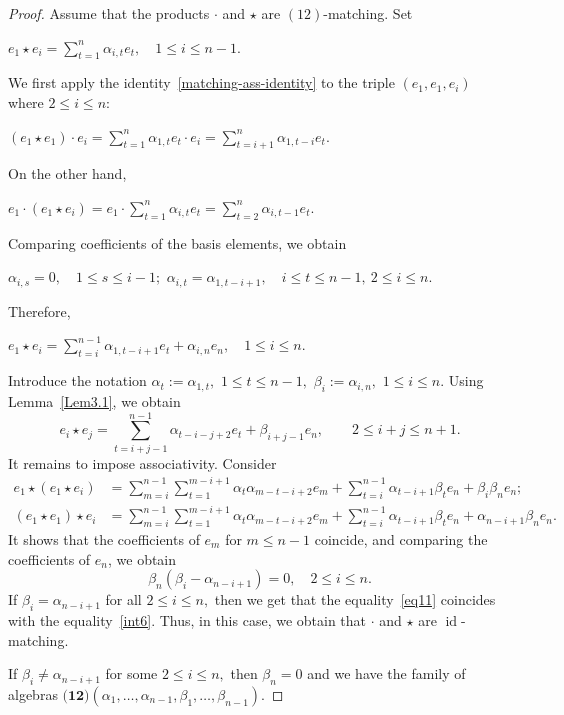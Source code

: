 \documentclass{jonasart}
\DeclareMathOperator{\id}{id}
\begin{document}
	\begin{proof}
		Assume that the products $\cdot$ and $\star$ are $ (12)$-matching. Set
		\begin{center}
			$e_1\star e_i =\sum_{t=1}^{n}\alpha_{i,t}e_t, \quad 1 \leq i \leq n-1.$
		\end{center}
		We first apply the identity~\eqref{matching-ass-identity} to the triple
		$(e_1, e_1, e_i )$ where $2\leq i \leq n:$
		\begin{center}
			$(e_1 \star e_1 )\cdot e_i =\sum_{t=1}^{n}\alpha_{1,t}e_t \cdot e_i =\sum_{t=i+1}^{n}\alpha_{1,t-i}e_t.$
		\end{center}
		On the other hand,
		\begin{center}
			$e_1\cdot (e_1\star e_i )= e_1\cdot \sum_{t=1}^{n}\alpha_{i,t}e_t = \sum_{t=2}^{n}\alpha_{i,t-1}e_t.$
		\end{center}
		Comparing coefficients of the basis elements, we obtain
		\begin{center}
			$\alpha_{i,s}=0, \quad 1\leq s\leq i-1;$ \quad $\alpha_{i,t}=\alpha_{1,t-i+1}, \quad i\leq t\leq n-1, \ 2\leq i\leq n.$
		\end{center}
		Therefore,
		\begin{center}
			$ e_1 \star e_i = \sum_{t=i}^{n-1}\alpha_{1,t-i+1}e_t + \alpha_{i,n} e_n, \quad 1\leq i\leq n.$
		\end{center}
		Introduce the notation $\alpha_t:=\alpha_{1,t},$ $1\leq t\leq n-1,$ $\beta_{i}:=\alpha_{i,n},$ $1\leq i\leq n.$
		Using Lemma~\ref{Lem3.1}, we obtain
		\begin{equation}\label{eq11}
			e_i \star e_j = \sum_{t=i+j-1}^{n-1}\alpha_{t-i-j+2}e_t + \beta_{i+j-1} e_n, \qquad 2 \leq i+j \leq n+1.
		\end{equation}
		It remains to impose associativity. Consider
		\begin{align*}
			e_1 \star (e_1 \star e_i ) &= \sum_{m=i}^{n-1} \sum_{t=1}^{m-i+1} \alpha_{t} \alpha_{m-t-i+2}e_m + \sum_{t=i}^{n-1} \alpha_{t-i+1}\beta_{t}e_n + \beta_i \beta_n e_n;\\
			(e_1 \star e_1 ) \star e_i
			&=\sum_{m=i}^{n-1} \sum_{t=1}^{m-i+1} \alpha_{t} \alpha_{m-t-i+2}e_m + \sum_{t=i}^{n-1} \alpha_{t-i+1}\beta_{t}e_n + \alpha_{n-i+1}\beta_{n}e_n.
		\end{align*}
		It shows that the coefficients of $e_m$ for
		$m \leq n-1$ coincide, and comparing the coefficients of $e_n$, we obtain
		\[
			\beta_n (\beta_i -\alpha_{n-i+1})=0, \quad 2\leq i\leq n.
		\]
		If $\beta_i = \alpha_{n-i+1}$ for all $2\leq i\leq n,$ then we get that the equality~\eqref{eq11} coincides with the equality~\eqref{int6}. Thus, in this case, we obtain that $\cdot$ and $\star$ are $\id$-matching.

		If $\beta_i \neq \alpha_{n-i+1}$ for some $2\leq i\leq n,$ then $\beta_n =0$ and we have the family of algebras $\textbf{(12)}(\alpha_1,\dots, \alpha_{n-1}, \beta_1,\dots, \beta_{n-1}).$
	\end{proof}
\end{document}
